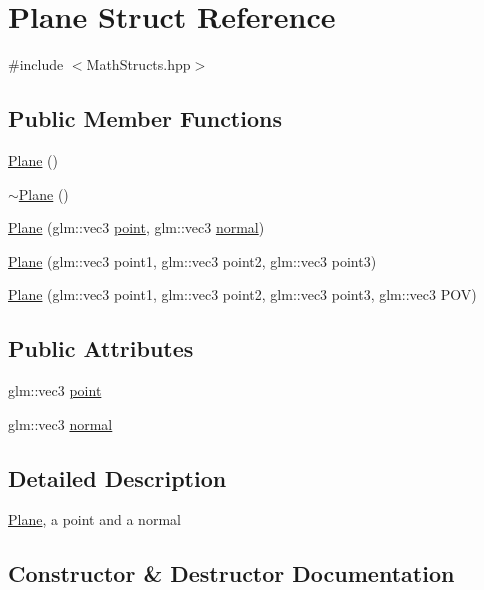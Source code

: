 \hypertarget{struct_plane}{}\section{Plane Struct Reference}
\label{struct_plane}


{\ttfamily \#include $<$Math\+Structs.\+hpp$>$}

\subsection*{Public Member Functions}
\begin{DoxyCompactItemize}
\item 
\hyperlink{struct_plane_acac0d9c003e0ab10d07b146c3566a0c7}{Plane} ()
\item 
\hyperlink{struct_plane_a69abd86051c880dcb44b249ad10c4436}{$\sim$\+Plane} ()
\item 
\hyperlink{struct_plane_ac45163c29d0529709652efd4c7ec529d}{Plane} (glm\+::vec3 \hyperlink{struct_plane_a14c0e6216fc3ff3bf3506f9adc1849c5}{point}, glm\+::vec3 \hyperlink{struct_plane_afde9acf6016a6376ec010868b6ad1787}{normal})
\item 
\hyperlink{struct_plane_af97ddf0b52e0211a6deb268e6ec634cd}{Plane} (glm\+::vec3 point1, glm\+::vec3 point2, glm\+::vec3 point3)
\item 
\hyperlink{struct_plane_aba494eec54252c34640b959b3679a98c}{Plane} (glm\+::vec3 point1, glm\+::vec3 point2, glm\+::vec3 point3, glm\+::vec3 P\+O\+V)
\end{DoxyCompactItemize}
\subsection*{Public Attributes}
\begin{DoxyCompactItemize}
\item 
glm\+::vec3 \hyperlink{struct_plane_a14c0e6216fc3ff3bf3506f9adc1849c5}{point}
\item 
glm\+::vec3 \hyperlink{struct_plane_afde9acf6016a6376ec010868b6ad1787}{normal}
\end{DoxyCompactItemize}


\subsection{Detailed Description}
\hyperlink{struct_plane}{Plane}, a point and a normal 

\subsection{Constructor \& Destructor Documentation}
\hypertarget{struct_plane_acac0d9c003e0ab10d07b146c3566a0c7}{}

